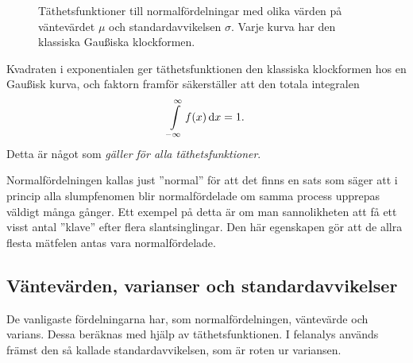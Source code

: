 \documentclass[11pt,a4paper, swedish
]{article}
\newcounter{exempel_counter}%
\begin{document}

\begin{figure}
\centering

\caption{Täthetsfunktioner till normalfördelningar med olika värden på
väntevärdet $\mu$ och standardavvikelsen $\sigma$. Varje kurva har den
klassiska Gau\ss{}iska klockformen.}\label{fig:normal_dist}
\end{figure}

Kvadraten i exponentialen ger täthetsfunktionen den
klassiska klockformen hos en Gau\ss{}isk kurva, och faktorn framför
säkerställer att den totala integralen
\begin{equation}
\int_{-\infty}^{\infty} f(x)\id{x} = 1.
\end{equation}
Detta är något som \emph{gäller för alla täthetsfunktioner}. 

Normalfördelningen kallas just ''normal'' för att det finns en sats
som säger att i princip alla slumpfenomen blir normalfördelade om
samma process upprepas väldigt många gånger. Ett exempel på detta är
om man sannolikheten att få ett visst antal ''klave'' efter flera
slantsinglingar. Den här egenskapen gör att de allra flesta 
mätfelen antas vara normalfördelade.



\subsection{Väntevärden, varianser och standardavvikelser}
De vanligaste fördelningarna har, som normalfördelningen, väntevärde
och varians. Dessa beräknas med hjälp av täthetsfunktionen. I
felanalys används främst den så kallade standardavvikelsen, som 
är roten ur variansen.
\end{document}
